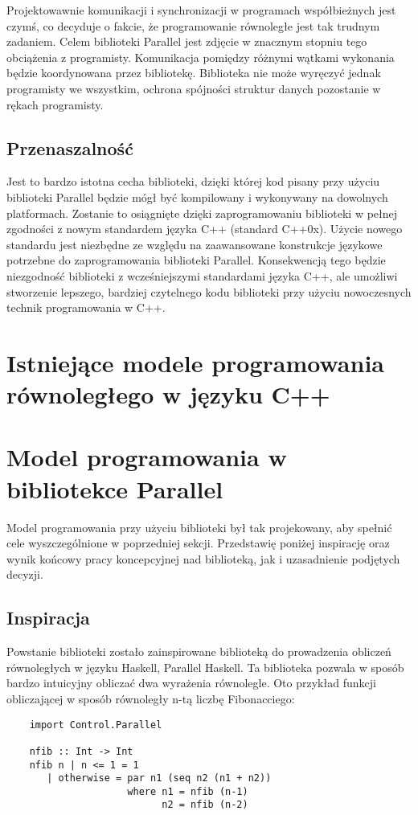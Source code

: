   Projektowawnie komunikacji i synchronizacji w programach współbieżnych jest czymś, co decyduje o fakcie, że programowanie równoległe jest tak trudnym zadaniem.
  Celem biblioteki Parallel jest zdjęcie w znacznym stopniu tego obciążenia z programisty.
  Komunikacja pomiędzy różnymi wątkami wykonania będzie koordynowana przez bibliotekę.
  Biblioteka nie może wyręczyć jednak programisty we wszystkim, ochrona spójności struktur danych pozostanie w rękach programisty.
  
\subsection{Przenaszalność}
  
  Jest to bardzo istotna cecha biblioteki, dzięki której kod pisany przy użyciu biblioteki Parallel będzie mógł być kompilowany i wykonywany na dowolnych platformach.
  Zostanie to osiągnięte dzięki zaprogramowaniu biblioteki w pełnej zgodności z nowym standardem języka C++ (standard C++0x).
  Użycie nowego standardu jest niezbędne ze względu na zaawansowane konstrukcje językowe potrzebne do zaprogramowania biblioteki Parallel.
  Konsekwencją tego będzie niezgodność biblioteki z wcześniejszymi standardami języka C++, ale umożliwi stworzenie lepszego, bardziej czytelnego kodu biblioteki przy użyciu nowoczesnych technik programowania w C++.

\section{Istniejące modele programowania równoległego w języku C++}

  

\section{Model programowania w bibliotekce Parallel}

  Model programowania przy użyciu biblioteki był tak projekowany, aby spełnić cele wyszczególnione w poprzedniej sekcji.
  Przedstawię poniżej inspirację oraz wynik końcowy pracy koncepcyjnej nad biblioteką, jak i uzasadnienie podjętych decyzji.

\subsection{Inspiracja}

  Powstanie biblioteki zostało zainspirowane biblioteką do prowadzenia obliczeń równoległych w języku Haskell, Parallel Haskell\cite{parhas}.
  Ta biblioteka pozwala w sposób bardzo intuicyjny obliczać dwa wyrażenia równolegle.
  Oto przykład funkcji obliczającej w sposób równoległy n-tą liczbę Fibonacciego:
  \begin{verbatim}
    import Control.Parallel

    nfib :: Int -> Int
    nfib n | n <= 1 = 1
       | otherwise = par n1 (seq n2 (n1 + n2))
                     where n1 = nfib (n-1)
                           n2 = nfib (n-2)
  \end{verbatim}
  
